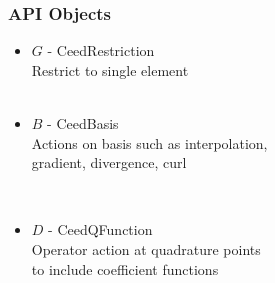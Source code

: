 \documentclass{beamer}
\begin{document}
\begin{frame}
\begin{center}
\frametitle{API Objects}

\begin{itemize}

\item $G$ - CeedRestriction\\

\hspace{6mm} Restrict to single element\\

~\\

\item {\color{blue(ncs)} $B$} - CeedBasis\\

\hspace{6mm} Actions on basis such as interpolation,\\

\hspace{6mm} gradient, divergence, curl

~\\

\item {\color{applegreen} $D$} - CeedQFunction\\

\hspace{6mm} Operator action at quadrature points\\

\hspace{6mm} to include coefficient functions

\end{itemize}

\end{center}
\end{frame}

\end{document}
